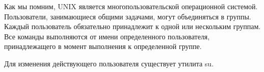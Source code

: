 Как мы помним, UNIX является многопользовательской операционной системой. Пользователи, занимающиеся общими задачами, могут объединяться в группы. Каждый пользователь обязательно принадлежит к одной или нескольким группам. Все команды выполняются от имени определенного пользователя, принадлежащего в момент выполнения к определенной группе.

Для изменения действующего пользователя существует утилита su.
